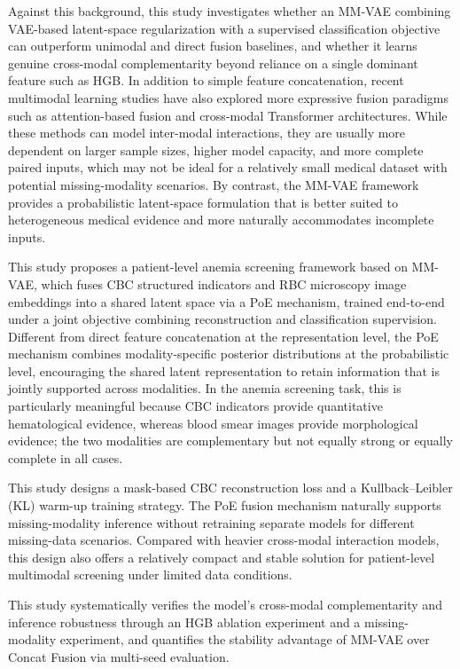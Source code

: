 \documentclass[conference]{IEEEtran}
\begin{document}
Against this background, this study investigates whether an MM-VAE combining VAE-based latent-space regularization with a supervised classification objective can outperform unimodal and direct fusion baselines, and whether it learns genuine cross-modal complementarity beyond reliance on a single dominant feature such as HGB. In addition to simple feature concatenation, recent multimodal learning studies have also explored more expressive fusion paradigms such as attention-based fusion and cross-modal Transformer architectures. While these methods can model inter-modal interactions, they are usually more dependent on larger sample sizes, higher model capacity, and more complete paired inputs, which may not be ideal for a relatively small medical dataset with potential missing-modality scenarios. By contrast, the MM-VAE framework provides a probabilistic latent-space formulation that is better suited to heterogeneous medical evidence and more naturally accommodates incomplete inputs.

This study proposes a patient-level anemia screening framework based on MM-VAE, which fuses CBC structured indicators and RBC microscopy image embeddings into a shared latent space via a PoE mechanism, trained end-to-end under a joint objective combining reconstruction and classification supervision. Different from direct feature concatenation at the representation level, the PoE mechanism combines modality-specific posterior distributions at the probabilistic level, encouraging the shared latent representation to retain information that is jointly supported across modalities. In the anemia screening task, this is particularly meaningful because CBC indicators provide quantitative hematological evidence, whereas blood smear images provide morphological evidence; the two modalities are complementary but not equally strong or equally complete in all cases.

This study designs a mask-based CBC reconstruction loss and a Kullback--Leibler (KL) warm-up training strategy. The PoE fusion mechanism naturally supports missing-modality inference without retraining separate models for different missing-data scenarios. Compared with heavier cross-modal interaction models, this design also offers a relatively compact and stable solution for patient-level multimodal screening under limited data conditions.

This study systematically verifies the model's cross-modal complementarity and inference robustness through an HGB ablation experiment and a missing-modality experiment, and quantifies the stability advantage of MM-VAE over Concat Fusion via multi-seed evaluation.
\end{document}

